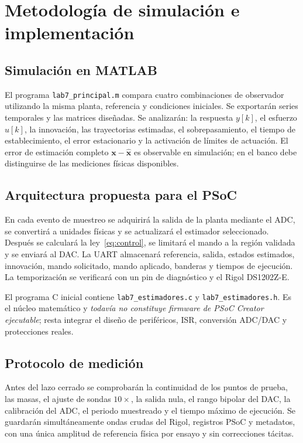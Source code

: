 \section{Metodología de simulación e implementación}
\subsection{Simulación en MATLAB}
El programa \texttt{lab7\_principal.m} compara cuatro combinaciones de
observador utilizando la misma planta, referencia y condiciones iniciales.
Se exportarán series temporales y las matrices diseñadas. Se analizarán:
la respuesta \(y[k]\), el esfuerzo \(u[k]\), la innovación, las
trayectorias estimadas, el sobrepasamiento, el tiempo de establecimiento,
el error estacionario y la activación de límites de actuación. El error de
estimación completo \(\mathbf x-\widehat{\mathbf x}\) es observable en
simulación; en el banco debe distinguirse de las mediciones físicas
disponibles.

\subsection{Arquitectura propuesta para el PSoC}
En cada evento de muestreo se adquirirá la salida de la planta mediante el
ADC, se convertirá a unidades físicas y se actualizará el estimador
seleccionado. Después se calculará la ley~\eqref{eq:control}, se limitará
el mando a la región validada y se enviará al DAC. La UART almacenará
referencia, salida, estados estimados, innovación, mando solicitado,
mando aplicado, banderas y tiempos de ejecución. La temporización se
verificará con un pin de diagnóstico y el Rigol DS1202Z-E.

El programa C inicial contiene \texttt{lab7\_estimadores.c} y
\texttt{lab7\_estimadores.h}. Es el núcleo matemático y
\emph{todavía no constituye firmware de PSoC Creator ejecutable};
resta integrar el diseño de periféricos, ISR, conversión ADC/DAC y
protecciones reales.

\subsection{Protocolo de medición}
Antes del lazo cerrado se comprobarán la continuidad de los puntos de
prueba, las masas, el ajuste de sondas \(10\times\), la salida nula,
el rango bipolar del DAC, la calibración del ADC, el periodo muestreado
y el tiempo máximo de ejecución. Se guardarán simultáneamente ondas
crudas del Rigol, registros PSoC y metadatos, con una única amplitud de
referencia física por ensayo y sin correcciones tácitas.
